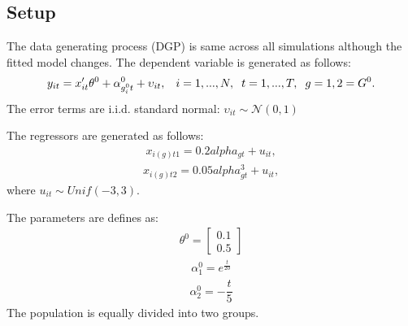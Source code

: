 \subsection{Setup}\label{section:DGP}
The data generating process (DGP) is same across all simulations although the fitted model changes.
The dependent variable is generated as follows:
\begin{align}
 y_{it} = x_{it}'\theta^0 + \alpha_{g_i^0t}^0 + \upsilon_{it}, \hspace{0.3cm} i=1,...,N,  \hspace{0.2cm} t=1,...,T, \hspace{0.2cm} g=1,2=G^0.
\end{align}
The error terms are i.i.d. standard normal: $\upsilon_{it} \sim \mathcal{N}(0, 1)$

The regressors are generated as follows:
\begin{align}
x_{i(g)t1} = 0.2 alpha_{gt} + u_{it},
\end{align}
\begin{align}
    x_{i(g)t2} = 0.05alpha_{gt}^3 + u_{it},
\end{align}
where $u_{it}  \sim Unif(-3,3)$.

The parameters are defines as:
\begin{align}
    \theta^0 = \left[\begin{array}{c}
         0.1 \\
         0.5
    \end{array}\right]
\end{align}
\begin{align}
     \alpha_1^0 = e^{\frac{t}{20}}
\end{align}
\begin{align}
    \alpha_2^0 = -\dfrac{t}{5}
\end{align}
The population is equally divided into two groups.

